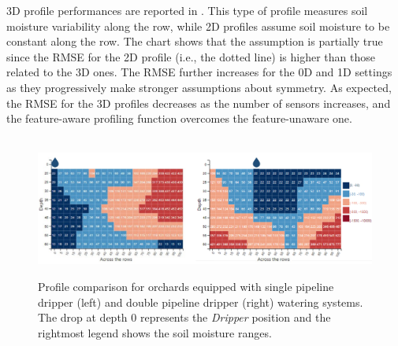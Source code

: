 3D profile performances are reported in . This type of profile measures soil moisture variability along the row, while 2D profiles assume soil moisture to be constant along the row. 
The chart shows that the assumption is partially true since the RMSE for the 2D profile (i.e., the dotted line) is higher than those related to the 3D ones. 
The RMSE further increases for the 0D and 1D settings as they progressively make stronger assumptions about symmetry. 
As expected, the RMSE for the 3D profiles decreases as the number of sensors increases, and the feature-aware profiling function overcomes the feature-unaware one.

\begin{figure}[t]
\centering\
\includegraphics[scale=.13]{chapters/physics-aware/pluto/img/single-double-pipeline.pdf}
\caption{Profile comparison for orchards equipped with single pipeline dripper (left) and double pipeline dripper (right) watering systems. The drop at depth $0$ represents the \textit{Dripper} position and the rightmost legend shows the soil moisture ranges.}
\label{pluto-fig:pipeline-comparison}
\end{figure}

